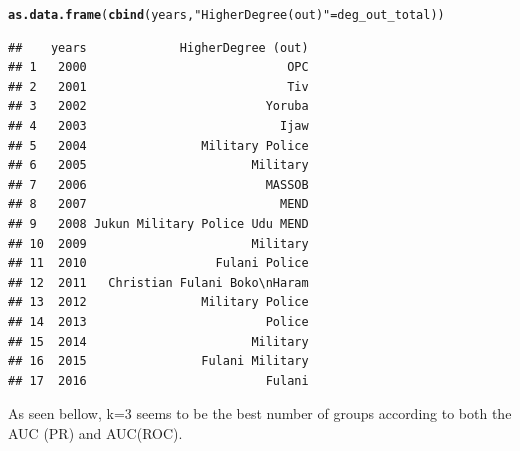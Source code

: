 \documentclass[12pt, letterpaper, notitlepage, onecolumn, twoside, openbib]{article}\usepackage[]{graphicx}\usepackage[]{color}
\makeatletter
\newcommand{\hlstr}[1]{\textcolor[rgb]{0.192,0.494,0.8}{#1}}%
\newcommand{\hlstd}[1]{\textcolor[rgb]{0.345,0.345,0.345}{#1}}%
\newcommand{\hlkwd}[1]{\textcolor[rgb]{0.737,0.353,0.396}{\textbf{#1}}}%
\newenvironment{kframe}{%
 \def\at@end@of@kframe{}%
 \ifinner\ifhmode%
  \def\at@end@of@kframe{\end{minipage}}%
  \begin{minipage}{\columnwidth}%
 \fi\fi%
 \def\FrameCommand##1{\hskip\@totalleftmargin \hskip-\fboxsep
 \colorbox{shadecolor}{##1}\hskip-\fboxsep
     \hskip-\linewidth \hskip-\@totalleftmargin \hskip\columnwidth}%
 \MakeFramed {\advance\hsize-\width
   \@totalleftmargin\z@ \linewidth\hsize
   \@setminipage}}%
 {\par\unskip\endMakeFramed%
 \at@end@of@kframe}
\newenvironment{knitrout}{}{} %
\makeatother
\begin{document}
\begin{knitrout}
\begin{kframe}
\begin{verbatim}
\end{verbatim}
\begin{alltt}
\hlkwd{as.data.frame}\hlstd{(}\hlkwd{cbind}\hlstd{(years,} \hlstr{"HigherDegree (out)"}\hlstd{=deg_out_total))}
\end{alltt}
\begin{verbatim}
##    years             HigherDegree (out)
## 1   2000                            OPC
## 2   2001                            Tiv
## 3   2002                         Yoruba
## 4   2003                           Ijaw
## 5   2004                Military Police
## 6   2005                       Military
## 7   2006                         MASSOB
## 8   2007                           MEND
## 9   2008 Jukun Military Police Udu MEND
## 10  2009                       Military
## 11  2010                  Fulani Police
## 12  2011   Christian Fulani Boko\nHaram
## 13  2012                Military Police
## 14  2013                         Police
## 15  2014                       Military
## 16  2015                Fulani Military
## 17  2016                         Fulani
\end{verbatim}
\end{kframe}
\end{knitrout}


As seen bellow, k=3 seems to be the best number of groups according to both the AUC (PR) and AUC(ROC).
\end{document}

